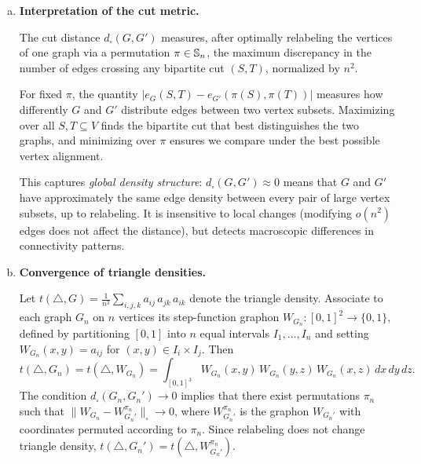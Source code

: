 \documentclass{article}
\begin{document}
\begin{tcolorbox}[colback=white, colframe=black!70, title=\textbf{Solution to Exercise 3}, breakable]

\begin{enumerate}[(a)]

\item \textbf{Interpretation of the cut metric.}

The cut distance $d_\square(G,G')$ measures, after optimally relabeling the vertices of one graph via a permutation $\pi \in \S_n$, the maximum discrepancy in the number of edges crossing any bipartite cut $(S,T)$, normalized by $n^2$.

For fixed $\pi$, the quantity $|e_G(S,T) - e_{G'}(\pi(S),\pi(T))|$ measures how differently $G$ and $G'$ distribute edges between two vertex subsets. Maximizing over all $S,T \subseteq V$ finds the bipartite cut that best distinguishes the two graphs, and minimizing over $\pi$ ensures we compare under the best possible vertex alignment.


This captures \emph{global density structure}: $d_\square(G,G') \approx 0$ means that $G$ and $G'$ have approximately the same edge density between every pair of large vertex subsets, up to relabeling. It is insensitive to local changes (modifying $o(n^2)$ edges does not affect the distance), but detects macroscopic differences in connectivity patterns.

\item \textbf{Convergence of triangle densities.}

Let $t(\triangle, G) = \frac{1}{n^3} \sum_{i,j,k} a_{ij}\, a_{jk}\, a_{ik}$ denote the triangle density. Associate to each graph $G_n$ on $n$ vertices its step-function graphon $W_{G_n}: [0,1]^2 \to \{0,1\}$, defined by partitioning $[0,1]$ into $n$ equal intervals $I_1, \ldots, I_n$ and setting $W_{G_n}(x,y) = a_{ij}$ for $(x,y) \in I_i \times I_j$. Then
\[
t(\triangle, G_n) = t(\triangle, W_{G_n}) = \int_{[0,1]^3} W_{G_n}(x,y)\, W_{G_n}(y,z)\, W_{G_n}(x,z)\, dx\, dy\, dz.
\]
The condition $d_\square(G_n, G_n') \to 0$ implies that there exist permutations $\pi_n$ such that $\|W_{G_n} - W_{G_n'}^{\pi_n}\|_\square \to 0$, where $W_{G_n'}^{\pi_n}$ is the graphon $W_{G_n'}$ with coordinates permuted according to $\pi_n$. Since relabeling does not change triangle density, $t(\triangle, G_n') = t(\triangle, W_{G_n'}^{\pi_n})$.


\end{enumerate}
\end{tcolorbox}
\end{document}

